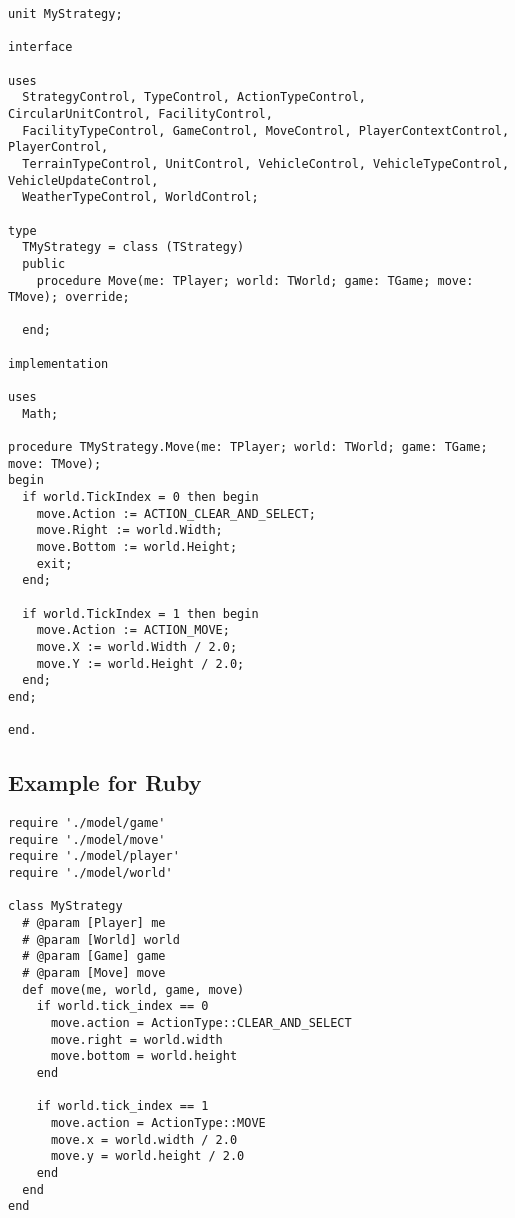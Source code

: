 \begin{verbatim}
unit MyStrategy;

interface

uses
  StrategyControl, TypeControl, ActionTypeControl, CircularUnitControl, FacilityControl,
  FacilityTypeControl, GameControl, MoveControl, PlayerContextControl, PlayerControl,
  TerrainTypeControl, UnitControl, VehicleControl, VehicleTypeControl, VehicleUpdateControl,
  WeatherTypeControl, WorldControl;

type
  TMyStrategy = class (TStrategy)
  public
    procedure Move(me: TPlayer; world: TWorld; game: TGame; move: TMove); override;

  end;

implementation

uses
  Math;
    
procedure TMyStrategy.Move(me: TPlayer; world: TWorld; game: TGame; move: TMove);
begin
  if world.TickIndex = 0 then begin
    move.Action := ACTION_CLEAR_AND_SELECT;
    move.Right := world.Width;
    move.Bottom := world.Height;
    exit;
  end;

  if world.TickIndex = 1 then begin
    move.Action := ACTION_MOVE;
    move.X := world.Width / 2.0;
    move.Y := world.Height / 2.0;
  end;
end;

end.
\end{verbatim}

\newpage
\subsection{Example for Ruby}

\begin{verbatim}
require './model/game'
require './model/move'
require './model/player'
require './model/world'

class MyStrategy
  # @param [Player] me
  # @param [World] world
  # @param [Game] game
  # @param [Move] move
  def move(me, world, game, move)
    if world.tick_index == 0
      move.action = ActionType::CLEAR_AND_SELECT
      move.right = world.width
      move.bottom = world.height
    end

    if world.tick_index == 1
      move.action = ActionType::MOVE
      move.x = world.width / 2.0
      move.y = world.height / 2.0
    end
  end
end
\end{verbatim}
